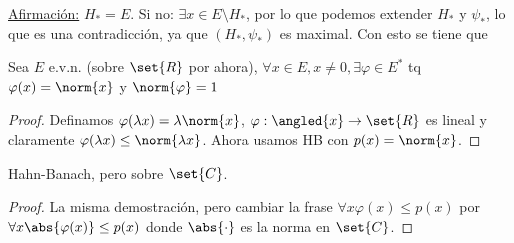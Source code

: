 \documentclass{notetaking}
\begin{document}
    \underline{Afirmación:} \(H_*=E\). Si no: \(\exists x\in E\setminus H_*\), por lo que podemos extender \(H_*\) y \(\psi_*\), lo que es una contradicción, ya que \((H_*,\psi_*)\) es maximal. Con esto se tiene que 
\begin{cor}
    Sea \(E\) e.v.n. (sobre \(\set{R}\) por ahora), \(\forall x\in E, x\neq0,\exists \varphi\in E^*\) tq \(\varphi(x)=\norm{x}\) y \(\norm{\varphi}=1\)
\end{cor}
\begin{proof}
    Definamos \(\varphi(\lambda x)=\lambda\norm{x}\), \(\varphi:\angled{x}\rightarrow\set{R}\) es lineal y claramente \(\varphi(\lambda x)\leq\norm{\lambda x}\). Ahora usamos HB con \(p(x)=\norm{x}\).
\end{proof}
\begin{thm}
    Hahn-Banach, pero sobre \(\set{C}\).
\end{thm}
\begin{proof}
    La misma demostración, pero cambiar la frase \(\forall x \varphi(x)\leq p(x)\) por \(\forall x\abs{\varphi(x)}\leq p(x)\) donde \(\abs{\cdot}\) es la norma en \(\set{C}\).
\end{proof}
\end{document}
